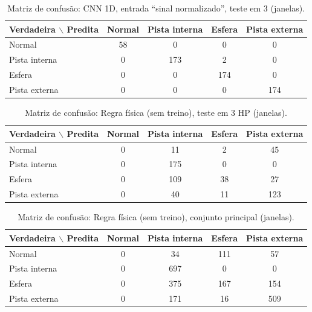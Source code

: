 \begin{table}[htb]
  \centering
  \caption{Matriz de confusão: CNN 1D, entrada ``sinal normalizado'', teste em \SI{3}{\hp} (janelas).}
  \label{tab:confusao-cnn-1d-sinal-normalizado}
  \begin{tabular}{lcccc}
    \toprule
    \textbf{Verdadeira $\backslash$ Predita} & \textbf{Normal} & \textbf{Pista interna} & \textbf{Esfera} & \textbf{Pista externa} \\
    \midrule
    Normal & 58 & 0 & 0 & 0 \\
    Pista interna & 0 & 173 & 2 & 0 \\
    Esfera & 0 & 0 & 174 & 0 \\
    Pista externa & 0 & 0 & 0 & 174 \\
    \bottomrule
  \end{tabular}
\end{table}

\begin{table}[htb]
  \centering
  \caption{Matriz de confusão: Regra física (sem treino), teste em 3 HP (janelas).}
  \label{tab:confusao-regra-fisica-sem-treino-teste-em-3-hp}
  \begin{tabular}{lcccc}
    \toprule
    \textbf{Verdadeira $\backslash$ Predita} & \textbf{Normal} & \textbf{Pista interna} & \textbf{Esfera} & \textbf{Pista externa} \\
    \midrule
    Normal & 0 & 11 & 2 & 45 \\
    Pista interna & 0 & 175 & 0 & 0 \\
    Esfera & 0 & 109 & 38 & 27 \\
    Pista externa & 0 & 40 & 11 & 123 \\
    \bottomrule
  \end{tabular}
\end{table}

\begin{table}[htb]
  \centering
  \caption{Matriz de confusão: Regra física (sem treino), conjunto principal (janelas).}
  \label{tab:confusao-regra-fisica-sem-treino-conjunto-principal}
  \begin{tabular}{lcccc}
    \toprule
    \textbf{Verdadeira $\backslash$ Predita} & \textbf{Normal} & \textbf{Pista interna} & \textbf{Esfera} & \textbf{Pista externa} \\
    \midrule
    Normal & 0 & 34 & 111 & 57 \\
    Pista interna & 0 & 697 & 0 & 0 \\
    Esfera & 0 & 375 & 167 & 154 \\
    Pista externa & 0 & 171 & 16 & 509 \\
    \bottomrule
  \end{tabular}
\end{table}
